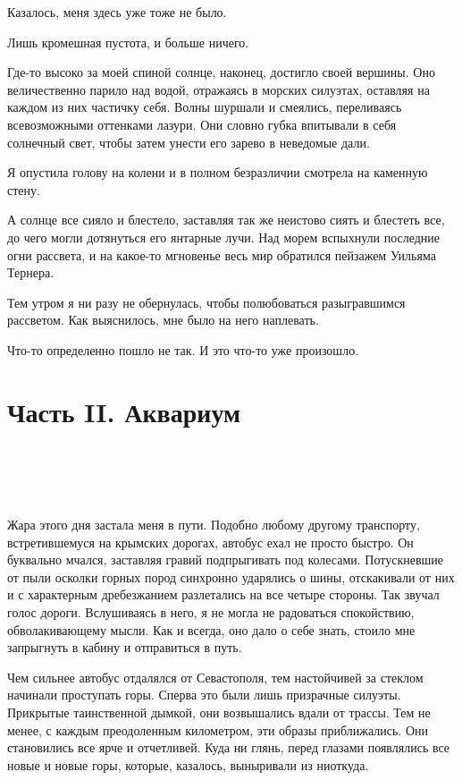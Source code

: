 \documentclass[
]{book}
\begin{document}
Казалось, меня здесь уже тоже не было.

Лишь кромешная пустота, и больше ничего.

Где-то высоко за моей спиной солнце, наконец, достигло своей вершины. Оно величественно парило над водой, отражаясь в морских силуэтах, оставляя на каждом из них частичку себя. Волны шуршали и смеялись, переливаясь всевозможными оттенками лазури. Они словно губка впитывали в себя солнечный свет, чтобы затем унести его зарево в неведомые дали.

Я опустила голову на колени и в полном безразличии смотрела на каменную стену.

А солнце все сияло и блестело, заставляя так же неистово сиять и блестеть все, до чего могли дотянуться его янтарные лучи. Над морем вспыхнули последние огни рассвета, и на какое-то мгновенье весь мир обратился пейзажем Уильяма Тернера.

Тем утром я ни разу не обернулась, чтобы полюбоваться разыгравшимся рассветом. Как выяснилось, мне было на него наплевать.

Что-то определенно пошло не так. И это что-то уже произошло.

\hypertarget{ux447ux430ux441ux442ux44c-ii.-ux430ux43aux432ux430ux440ux438ux443ux43c}{%
\chapter*{Часть II. Аквариум}\label{ux447ux430ux441ux442ux44c-ii.-ux430ux43aux432ux430ux440ux438ux443ux43c}}

\hypertarget{chapter-56}{%
\chapter{~}\label{chapter-56}}

Жара этого дня застала меня в пути. Подобно любому другому транспорту, встретившемуся на крымских дорогах, автобус ехал не просто быстро. Он буквально мчался, заставляя гравий подпрыгивать под колесами. Потускневшие от пыли осколки горных пород синхронно ударялись о шины, отскакивали от них и с характерным дребезжанием разлетались на все четыре стороны. Так звучал голос дороги. Вслушиваясь в него, я не могла не радоваться спокойствию, обволакивающему мысли. Как и всегда, оно дало о себе знать, стоило мне запрыгнуть в кабину и отправиться в путь.

Чем сильнее автобус отдалялся от Севастополя, тем настойчивей за стеклом начинали проступать горы. Сперва это были лишь призрачные силуэты. Прикрытые таинственной дымкой, они возвышались вдали от трассы. Тем не менее, с каждым преодоленным километром, эти образы приближались. Они становились все ярче и отчетливей. Куда ни глянь, перед глазами появлялись все новые и новые горы, которые, казалось, выныривали из ниоткуда.
\end{document}
